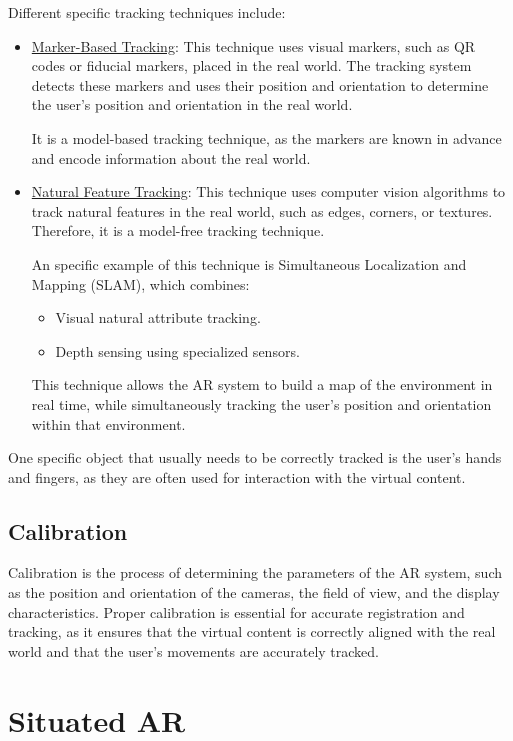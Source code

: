 Different specific tracking techniques include:
\begin{itemize}
    \item \ul{Marker-Based Tracking}: This technique uses visual markers, such as QR codes or fiducial markers, placed in the real world. The tracking system detects these markers and uses their position and orientation to determine the user's position and orientation in the real world.
    
    It is a model-based tracking technique, as the markers are known in advance and encode information about the real world.
    
    \item \ul{Natural Feature Tracking}: This technique uses computer vision algorithms to track natural features in the real world, such as edges, corners, or textures. Therefore, it is a model-free tracking technique.
    
    An specific example of this technique is Simultaneous Localization and Mapping (SLAM), which combines:
    \begin{itemize}
        \item Visual natural attribute tracking.
        \item Depth sensing using specialized sensors.
    \end{itemize}
    This technique allows the AR system to build a map of the environment in real time, while simultaneously tracking the user's position and orientation within that environment.
\end{itemize}

One specific object that usually needs to be correctly tracked is the user's hands and fingers, as they are often used for interaction with the virtual content.

\subsection{Calibration}

Calibration is the process of determining the parameters of the AR system, such as the position and orientation of the cameras, the field of view, and the display characteristics. Proper calibration is essential for accurate registration and tracking, as it ensures that the virtual content is correctly aligned with the real world and that the user's movements are accurately tracked.


\section{Situated AR}

